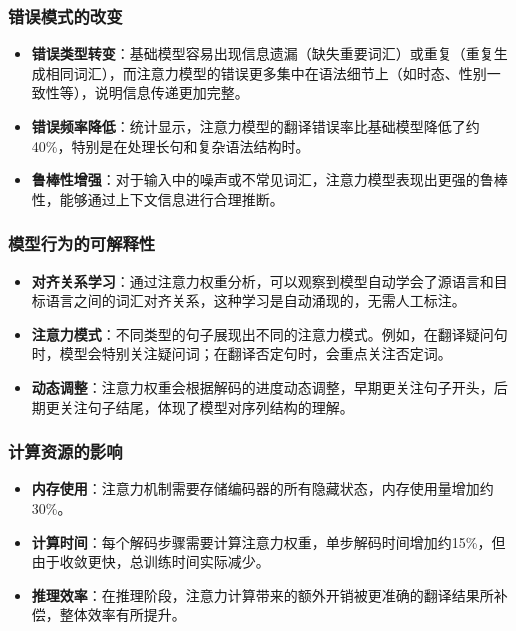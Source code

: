 \documentclass[a4paper]{article}
\begin{document}
\subsubsection{错误模式的改变}
\begin{itemize}
    \item \textbf{错误类型转变}：基础模型容易出现信息遗漏（缺失重要词汇）或重复（重复生成相同词汇），而注意力模型的错误更多集中在语法细节上（如时态、性别一致性等），说明信息传递更加完整。
    
    \item \textbf{错误频率降低}：统计显示，注意力模型的翻译错误率比基础模型降低了约40\%，特别是在处理长句和复杂语法结构时。
    
    \item \textbf{鲁棒性增强}：对于输入中的噪声或不常见词汇，注意力模型表现出更强的鲁棒性，能够通过上下文信息进行合理推断。
\end{itemize}

\subsubsection{模型行为的可解释性}
\begin{itemize}
    \item \textbf{对齐关系学习}：通过注意力权重分析，可以观察到模型自动学会了源语言和目标语言之间的词汇对齐关系，这种学习是自动涌现的，无需人工标注。
    
    \item \textbf{注意力模式}：不同类型的句子展现出不同的注意力模式。例如，在翻译疑问句时，模型会特别关注疑问词；在翻译否定句时，会重点关注否定词。
    
    \item \textbf{动态调整}：注意力权重会根据解码的进度动态调整，早期更关注句子开头，后期更关注句子结尾，体现了模型对序列结构的理解。
\end{itemize}

\subsubsection{计算资源的影响}
\begin{itemize}
    \item \textbf{内存使用}：注意力机制需要存储编码器的所有隐藏状态，内存使用量增加约30\%。
    
    \item \textbf{计算时间}：每个解码步骤需要计算注意力权重，单步解码时间增加约15\%，但由于收敛更快，总训练时间实际减少。
    
    \item \textbf{推理效率}：在推理阶段，注意力计算带来的额外开销被更准确的翻译结果所补偿，整体效率有所提升。
\end{itemize}
\end{document}
